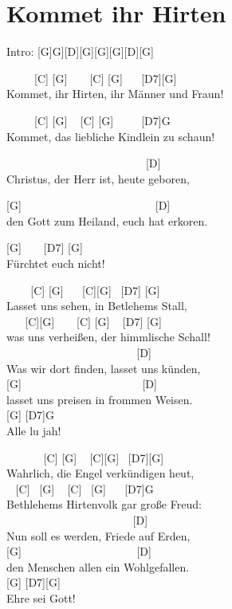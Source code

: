\documentclass[
  letterpaper,
  twoside=false]{scrbook}
\begin{document}
\hypertarget{kommet-ihr-hirten}{%
\chapter{Kommet ihr Hirten}\label{kommet-ihr-hirten}}

Intro: {[}G{]}G{]}{[}D{]}{[}G{]}{[}G{]}{[}G{]}{[}D{]}{[}G{]}

~ ~ ~ {[}C{]} {[}G{]} ~ ~ {[}C{]} {[}G{]} ~ ~{[}D7{]}{[}G{]}\\
Kommet, ihr Hirten, ihr Männer und Fraun!

~ ~ ~ {[}C{]} {[}G{]} ~ {[}C{]} {[}G{]} ~ ~ ~{[}D7{]}G\\
Kommet, das liebliche Kindlein zu schaun!

~ ~ ~ ~ ~ ~ ~ ~ ~ ~ ~ ~ ~ ~ ~ {[}D{]}\\
Christus, der Herr ist, heute geboren,

{[}G{]} ~ ~ ~ ~ ~ ~ ~ ~ ~ ~ ~ ~ ~ ~ {[}D{]}\\
den Gott zum Heiland, euch hat erkoren.

{[}G{]} ~ ~ {[}D7{]} {[}G{]}\\
Fürchtet euch nicht!

~ ~ ~{[}C{]} {[}G{]} ~ ~{[}C{]}{[}G{]} ~{[}D7{]} {[}G{]}\\
Lasset uns sehen, in Betlehems Stall,\\
\hspace*{0.333em} ~ ~ {[}C{]}{[}G{]} ~ ~ {[}C{]} {[}G{]} ~ {[}D7{]}
{[}G{]}\\
was uns verheißen, der himmlische Schall!\\
\hspace*{0.333em} ~ ~ ~ ~ ~ ~ ~ ~ ~ ~ ~ ~ ~ ~ {[}D{]}\\
Was wir dort finden, lasset uns künden,\\
{[}G{]} ~ ~ ~ ~ ~ ~ ~ ~ ~ ~ ~ ~ ~{[}D{]}\\
lasset uns preisen in frommen Weisen.\\
{[}G{]} {[}D7{]}G\\
Alle lu jah!

~ ~ ~ ~ {[}C{]} {[}G{]} ~ {[}C{]}{[}G{]} ~{[}D7{]}{[}G{]}\\
Wahrlich, die Engel verkündigen heut,\\
\hspace*{0.333em} ~ {[}C{]} ~{[}G{]} ~ {[}C{]} ~{[}G{]} ~ ~{[}D7{]}G\\
Bethlehems Hirtenvolk gar große Freud:\\
\hspace*{0.333em} ~ ~ ~ ~ ~ ~ ~ ~ ~ ~ ~ ~ ~ ~{[}D{]}\\
Nun soll es werden, Friede auf Erden,\\
{[}G{]} ~ ~ ~ ~ ~ ~ ~ ~ ~ ~ ~ ~ {[}D{]}\\
den Menschen allen ein Wohlgefallen.\\
{[}G{]} {[}D7{]}{[}G{]}\\
Ehre sei Gott!
\end{document}
